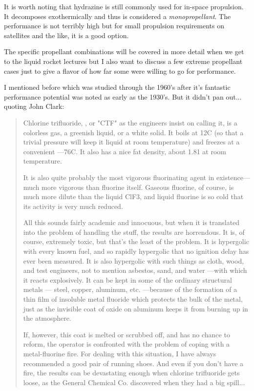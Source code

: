 \documentclass[twocolumn]{memoir} %
\begin{document}
It is worth noting that hydrazine is still commonly used for in-space propulsion.  It 
decomposes exothermically and thus is considered a \emph{monopropellant}.  The 
performance is not terribly high but for small propulsion requirements on satellites
and the like, it is a good option.

The specific propellant combinations will be covered in more detail when we get to the
liquid rocket lectures but I also want to discuss a few extreme propellant cases just to
give a flavor of how far some were willing to go for performance. 

I mentioned  before which was
studied through the 1960's after it's fantastic performance potential was noted as 
early as the 1930's.  But it didn't pan out... quoting John Clark:

\begin{quote}
    Chlorine trifluoride, , or "CTF" as the engineers insist on calling it, 
    is a colorless gas, a greenish liquid, or a white solid. It boils at 12C (so that 
    a trivial pressure will keep it liquid at room temperature) and freezes at a convenient
    —76C. It also has a nice fat density, about 1.81 at room temperature.

    It is also quite probably the most vigorous fluorinating agent in existence—much more 
    vigorous than fluorine itself. Gaseous fluorine, of course, is much more dilute than the 
    liquid ClF3, and liquid fluorine is so cold that its activity is very much reduced.
    
    All this sounds fairly academic and innocuous, but when it is translated into the 
    problem of handling the stuff, the results are horrendous. It is, of course, extremely 
    toxic, but that's the least of the problem. It is hypergolic with every known fuel, 
    and so rapidly hypergolic that no ignition delay has ever been measured. It is also hypergolic 
    with such things as cloth, wood, and test engineers, not to mention asbestos, sand, and 
    water —with which it reacts explosively. It can be kept in some of the ordinary structural 
    metals — steel, copper, aluminum, etc. —because of the formation of a thin film of insoluble 
    metal fluoride which protects the bulk of the metal, just as the invisible coat of oxide on aluminum
    keeps it from burning up in the atmosphere.

    If, however, this coat is melted or scrubbed off, and has no chance to reform, the operator
    is confronted with the problem of coping with a metal-fluorine fire. For dealing with this 
    situation, I have always recommended a good pair of running shoes. And even if you don't have 
    a fire, the results can be devastating enough when chlorine trifluoride gets loose, as the 
    General Chemical Co. discovered when they had a big spill...


\end{quote}
\end{document}
